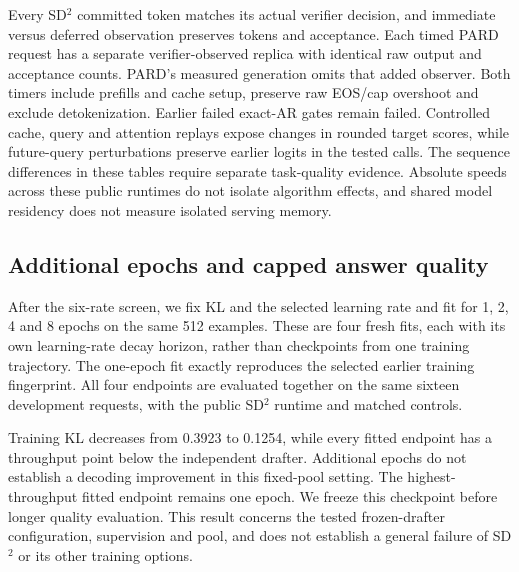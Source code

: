 \documentclass{article}
\begin{document}
Every SD$^2$ committed token matches its actual verifier decision, and
immediate versus deferred observation preserves tokens and acceptance.
Each timed PARD request has a separate verifier-observed replica with
identical raw output and acceptance counts. PARD's measured generation
omits that added observer. Both timers include prefills and cache setup,
preserve raw EOS/cap overshoot and exclude detokenization.
Earlier failed exact-AR gates remain failed. Controlled cache, query and
attention replays expose changes in rounded target scores, while
future-query perturbations preserve earlier logits in the tested calls.
The sequence differences in these tables require separate task-quality
evidence. Absolute speeds across these public runtimes do not isolate
algorithm effects, and shared model residency does not measure isolated
serving memory.

\subsection{Additional epochs and capped answer quality}

After the six-rate screen, we fix KL and the selected learning rate
and fit for 1, 2, 4 and 8 epochs on the same 512 examples. These are
four fresh fits, each with its own learning-rate decay horizon, rather
than checkpoints from one training trajectory. The one-epoch fit exactly
reproduces the selected earlier training fingerprint. All four endpoints
are evaluated together on the same sixteen development requests, with
the public SD$^2$ runtime and matched controls.

\begin{table}[H]
\caption{SD$^2$ epoch budget at fixed 512 distinct examples. Training KL
is the mean over updates in each final epoch. It is not held-out loss.
Independent-drafter throughput is 18.75 tokens/s. Intervals resample
paired requests and do not adjust for model selection.}
\label{tab:sd-square-epochs}
\centering\footnotesize
\setlength{\tabcolsep}{3pt}

\end{table}

Training KL decreases from 0.3923 to 0.1254, while every fitted endpoint
has a throughput point below the independent drafter. Additional epochs
do not establish a decoding improvement in this fixed-pool setting.
The highest-throughput fitted endpoint remains one epoch. We freeze
this checkpoint before longer quality evaluation. This result concerns
the tested frozen-drafter configuration, supervision and pool, and does
not establish a general failure of SD$^2$ or its other training options.
\end{document}
